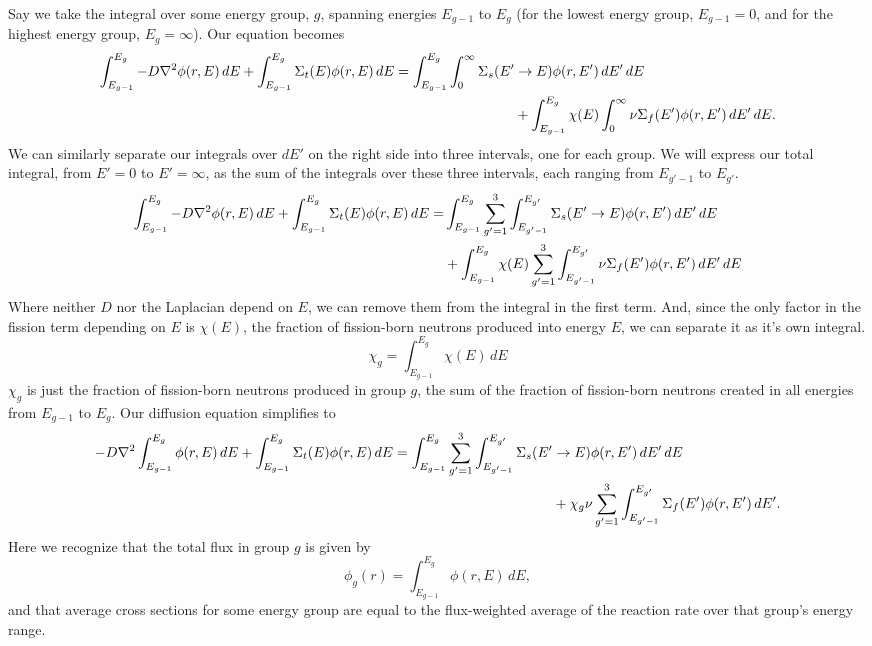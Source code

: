 \begin{enumerate}[a)]
Say we take the integral over some energy group, $g$, spanning energies $E_{g-1}$ to $E_g$ (for the lowest energy group, $E_{g-1} = 0$, and for the highest energy group, $E_g = \infty$). Our equation becomes
\begin{align*}
\int_{E_{g-1}}^{E_g} -D \nabla^2 \phi(r,E)\,dE + \int_{E_{g-1}}^{E_g} \Sigma_t(E) \phi(r,E)\,dE = \int_{E_{g-1}}^{E_g} \int_0^{\infty} \Sigma_s(E' &\rightarrow E)\phi(r,E')\,dE'\,dE \\
&+ \int_{E_{g-1}}^{E_g} \chi(E) \int_0^{\infty} \nu \Sigma_f(E')\phi(r,E')\,dE'\,dE .
\end{align*}
We can similarly separate our integrals over $dE'$ on the right side into three intervals, one for each group. We will express our total integral, from $E' = 0$ to $E'=\infty$, as the sum of the integrals over these three intervals, each ranging from $E_{g'-1}$ to $E_{g'}$.
\begin{align*}
\int_{E_{g-1}}^{E_g} -D \nabla^2 \phi(r,E)\,dE + \int_{E_{g-1}}^{E_g} \Sigma_t(E) \phi(r,E)\,dE = &\int_{E_{g-1}}^{E_g} \sum_{g'=1}^3 \int_{E_{g'-1}}^{E_{g'}} \Sigma_s(E' \rightarrow E)\phi(r,E')\,dE'\,dE \\
 &+ \int_{E_{g-1}}^{E_g} \chi(E) \sum_{g'=1}^3 \int_{E_{g'-1}}^{E_{g'}} \nu \Sigma_f(E')\phi(r,E')\,dE'\,dE 
\end{align*}
Where neither $D$ nor the Laplacian depend on $E$, we can remove them from the integral in the first term. And, since the only factor in the fission term depending on $E$ is $\chi(E)$, the fraction of fission-born neutrons produced into energy $E$, we can separate it as it's own integral. 
$$ \chi_g = \int_{E_{g-1}}^{E_g} \chi(E)\,dE $$
$\chi_g$ is just the fraction of fission-born neutrons produced in group $g$, the sum of the fraction of fission-born neutrons created in all energies from $E_{g-1}$ to $E_g$. Our diffusion equation simplifies to
\begin{align*}
-D \nabla^2 \int_{E_{g-1}}^{E_g} \phi(r,E)\,dE + \int_{E_{g-1}}^{E_g} \Sigma_t(E) \phi(r,E)\,dE = \int_{E_{g-1}}^{E_g} \sum_{g'=1}^3 \int_{E_{g'-1}}^{E_{g'}} \Sigma_s(E' &\rightarrow E)\phi(r,E')\,dE'\,dE \\
 &+ \chi_g \nu \sum_{g'=1}^3 \int_{E_{g'-1}}^{E_{g'}} \Sigma_f(E')\phi(r,E')\,dE' .
\end{align*}
Here we recognize that the total flux in group $g$ is given by
$$ \phi_g(r) = \int_{E_{g-1}}^{E_g} \phi(r,E)\,dE ,$$
and that average cross sections for some energy group are equal to the flux-weighted average of the reaction rate over that group's energy range.

\end{enumerate}
